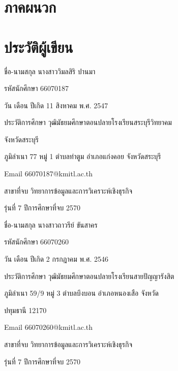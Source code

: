 \documentclass[12pt,a4paper]{report}
\begin{document}
\clearpage
\section*{ภาคผนวก}
\clearpage
\section*{ประวัติผู้เขียน}
ชื่อ-นามสกุล นางสาววิมลสิริ ปานมา\par
รหัสนักศึกษา 66070187\par
วัน เดือน ปีเกิด 11 สิงหาคม พ.ศ. 2547\par
ประวัติการศึกษา วุฒิมัธยมศึกษาตอนปลายโรงเรียนสระบุรีวิทยาคม\par
จังหวัดสระบุรี\par
ภูมิลำเนา 77 หมู่ 1 ตำบลท่าตูม อำเภอแก่งคอย จังหวัดสระบุรี\par
Email 66070187@kmitl.ac.th\par
สาขาที่จบ วิทยาการข้อมูลและการวิเคราะห์เชิงธุรกิจ\par
รุ่นที่ 7 ปีการศึกษาที่จบ 2570\par
ชื่อ-นามสกุล นางสาวถาวรีย์ ขันสาคร\par
รหัสนักศึกษา 66070260\par
วัน เดือน ปีเกิด 2 กรกฎาคม พ.ศ. 2546\par
ประวัติการศึกษา วุฒิมัธยมศึกษาตอนปลายโรงเรียนสายปัญญารังสิต\par
ภูมิลำเนา 59/9 หมู่ 3 ตำบลบึงบอน อำเภอหนองเสือ จังหวัด\par
ปทุมธานี 12170\par
Email 66070260@kmitl.ac.th\par
สาขาที่จบ วิทยาการข้อมูลและการวิเคราะห์เชิงธุรกิจ\par
รุ่นที่ 7 ปีการศึกษาที่จบ 2570\par
\end{document}
